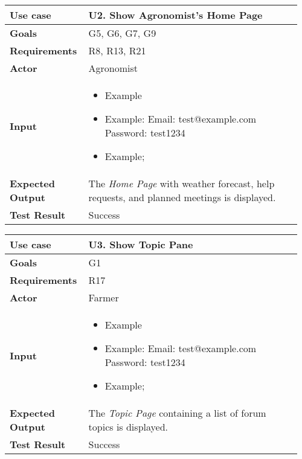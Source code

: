 \begin{longtable}{@{}p{0.25\linewidth}p{0.71\linewidth}@{}}
	\toprule
	\textbf{Use case} & \textbf{U2.} Show Agronomist's Home Page\\
	\midrule
	\textbf{Goals} & G5, G6, G7, G9\\
	\midrule
	\textbf{Requirements} & R8, R13, R21\\
	\midrule
	\textbf{Actor} & Agronomist\\
	\midrule
	\textbf{Input} & \begin{itemize}[leftmargin=.4cm,noitemsep,topsep=0pt,before=\vspace{-3mm},after=\vspace{-4mm}]
		\item Example
		\item Example:\newline
		Email: test@example.com\newline
		Password: test1234
		\item Example;
	\end{itemize}\\
	\midrule
	\textbf{Expected Output} & The \textit{Home Page} with weather forecast, help requests, and planned meetings is displayed.\\
	\midrule
	\textbf{Test Result} & Success\\
	\bottomrule
\end{longtable}

\begin{longtable}{@{}p{0.25\linewidth}p{0.71\linewidth}@{}}
	\toprule
	\textbf{Use case} & \textbf{U3.} Show Topic Pane\\
	\midrule
	\textbf{Goals} & G1\\
	\midrule
	\textbf{Requirements} & R17\\
	\midrule
	\textbf{Actor} & Farmer\\
	\midrule
	\textbf{Input} & \begin{itemize}[leftmargin=.4cm,noitemsep,topsep=0pt,before=\vspace{-3mm},after=\vspace{-4mm}]
		\item Example
		\item Example:\newline
		Email: test@example.com\newline
		Password: test1234
		\item Example;
	\end{itemize}\\
	\midrule
	\textbf{Expected Output} & The \textit{Topic Page} containing a list of forum topics is displayed.\\
	\midrule
	\textbf{Test Result} & Success\\
	\bottomrule
\end{longtable}

